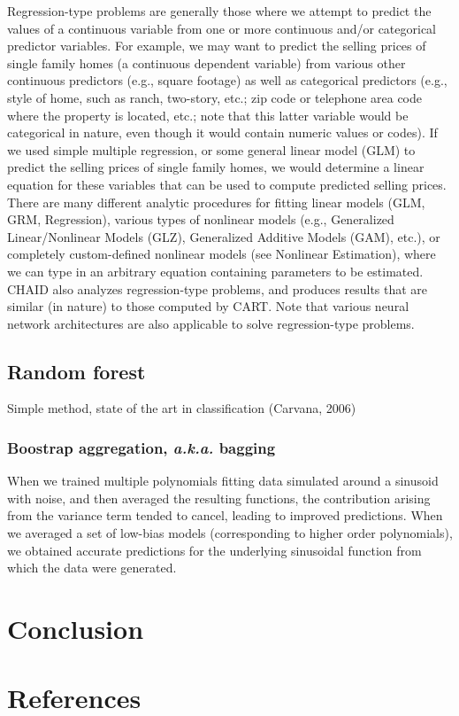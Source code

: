 \documentclass[final, paper=letter,5p,times,twocolumn]{elsarticle}
\begin{document}
Regression-type problems are generally those where we attempt to predict the values of a continuous variable from one or more continuous and/or categorical predictor variables. For example, we may want to predict the selling prices of single family homes (a continuous dependent variable) from various other continuous predictors (e.g., square footage) as well as categorical predictors (e.g., style of home, such as ranch, two-story, etc.; zip code or telephone area code where the property is located, etc.; note that this latter variable would be categorical in nature, even though it would contain numeric values or codes). If we used simple multiple regression, or some general linear model (GLM) to predict the selling prices of single family homes, we would determine a linear equation for these variables that can be used to compute predicted selling prices. There are many different analytic procedures for fitting linear models (GLM, GRM, Regression), various types of nonlinear models (e.g., Generalized Linear/Nonlinear Models (GLZ), Generalized Additive Models (GAM), etc.), or completely custom-defined nonlinear models (see Nonlinear Estimation), where we can type in an arbitrary equation containing parameters to be estimated. CHAID also analyzes regression-type problems, and produces results that are similar (in nature) to those computed by CART. Note that various neural network architectures are also applicable to solve regression-type problems.


\subsection{Random forest}

Simple method, state of the art in classification (Carvana, 2006)

\subsubsection{Boostrap aggregation, {\it a.k.a.} bagging}

When we trained multiple polynomials fitting data simulated around a sinusoid with noise, and then averaged the resulting functions, the contribution arising from the variance term tended to cancel, leading to improved predictions. When we averaged a set of low-bias models (corresponding to higher order polynomials), we obtained accurate predictions for the underlying sinusoidal function from which the data were generated.



\section{Conclusion}

\lipsum[6-10]

\section*{References}



\end{document}

